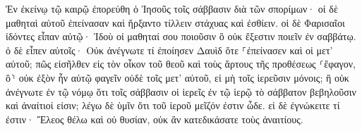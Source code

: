 \documentclass{openreader}
\begin{document}
Ἐν ἐκείνῳ τῷ καιρῷ ἐπορεύθη ὁ Ἰησοῦς τοῖς σάββασιν διὰ τῶν σπορίμων· οἱ δὲ μαθηταὶ αὐτοῦ ἐπείνασαν καὶ ἤρξαντο τίλλειν στάχυας καὶ ἐσθίειν. 
οἱ δὲ Φαρισαῖοι ἰδόντες εἶπαν αὐτῷ· Ἰδοὺ οἱ μαθηταί σου ποιοῦσιν ὃ οὐκ ἔξεστιν ποιεῖν ἐν σαββάτῳ. 
ὁ δὲ εἶπεν αὐτοῖς· Οὐκ ἀνέγνωτε τί ἐποίησεν Δαυὶδ ὅτε ⸀ἐπείνασεν καὶ οἱ μετ’ αὐτοῦ; 
πῶς εἰσῆλθεν εἰς τὸν οἶκον τοῦ θεοῦ καὶ τοὺς ἄρτους τῆς προθέσεως ⸂ἔφαγον, ὃ⸃ οὐκ ἐξὸν ἦν αὐτῷ φαγεῖν οὐδὲ τοῖς μετ’ αὐτοῦ, εἰ μὴ τοῖς ἱερεῦσιν μόνοις; 
ἢ οὐκ ἀνέγνωτε ἐν τῷ νόμῳ ὅτι τοῖς σάββασιν οἱ ἱερεῖς ἐν τῷ ἱερῷ τὸ σάββατον βεβηλοῦσιν καὶ ἀναίτιοί εἰσιν; 
λέγω δὲ ὑμῖν ὅτι τοῦ ἱεροῦ μεῖζόν ἐστιν ὧδε. 
εἰ δὲ ἐγνώκειτε τί ἐστιν· Ἔλεος θέλω καὶ οὐ θυσίαν, οὐκ ἂν κατεδικάσατε τοὺς ἀναιτίους. 
\end{document}
